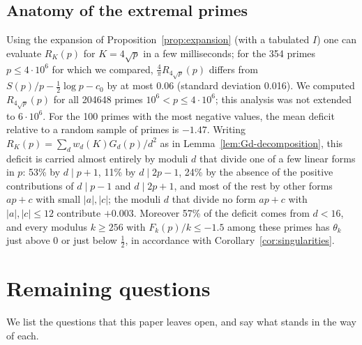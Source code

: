 \subsection{Anatomy of the extremal primes}\label{subsec:anatomy}
Using the expansion of Proposition~\ref{prop:expansion} (with a tabulated $I$) one can evaluate $R_K(p)$ for $K=4\sqrt p$ in a few milliseconds; for the 354 primes $p\le 4\cdot 10^6$ for which we compared, $\frac4\pi R_{4\sqrt p}(p)$ differs from $S(p)/p-\frac12\log p-c_0$ by at most 0.06 (standard deviation 0.016). We computed $R_{4\sqrt p}(p)$ for all 204648 primes $10^6<p\le 4\cdot 10^6$; this analysis was not extended to $6\cdot10^6$. For the 100 primes with the most negative values, the mean deficit relative to a random sample of primes is $-1.47$. Writing $R_K(p)=\sum_dw_d(K)G_d(p)/d^2$ as in Lemma~\ref{lem:Gd-decomposition}, this deficit is carried almost entirely by moduli $d$ that divide one of a few linear forms in $p$: 53\% by $d\mid p+1$, 11\% by $d\mid 2p-1$, 24\% by the absence of the positive contributions of $d\mid p-1$ and $d\mid 2p+1$, and most of the rest by other forms $ap+c$ with small $|a|,|c|$; the moduli $d$ that divide no form $ap+c$ with $|a|,|c|\le 12$ contribute $+0.003$. Moreover 57\% of the deficit comes from $d<16$, and every modulus $k\ge 256$ with $F_k(p)/k\le -1.5$ among these primes has $\theta_k$ just above 0 or just below $\frac12$, in accordance with Corollary~\ref{cor:singularities}.

\section{Remaining questions}\label{sec:remaining-questions}

We list the questions that this paper leaves open, and say what stands in the way of each.


